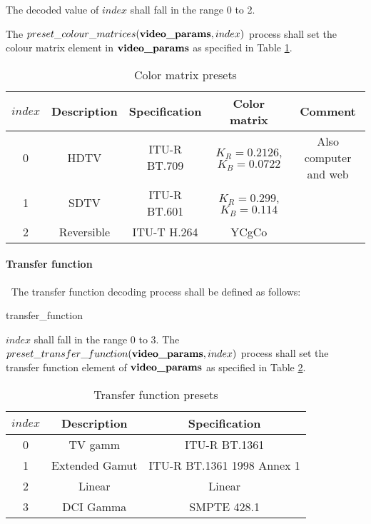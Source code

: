 The decoded value of $index$ shall fall in the range 0 to 2. 

The $preset\_colour\_matrices(\textbf{video\_params},index)$ process shall set the colour 
matrix element in $\textbf{video\_params}$ as specified
in Table \ref{table:matrixvalues}.

\begin{table}[!ht]
\centering
\begin{tabular}{|c|c|c|c|c|}
\hline
\rowcolor[gray]{0.75}$index$ &  {\bf Description} & {\bf Specification} & {\bf Color matrix} & {\bf Comment}\\
\hline
0 & HDTV & ITU-R BT.709 & $K_R=0.2126$, $K_B=0.0722$ & Also computer and web\\ 
\hline
1 & SDTV & ITU-R BT.601 & $K_R=0.299$, $K_B=0.114$ & \\
\hline
2 & Reversible & ITU-T H.264 & YCgCo & \\
\hline
\end{tabular}
\caption{Color matrix presets}\label{table:matrixvalues}
\end{table}

\paragraph{Transfer function}
\label{transferfunction}
$\ $\newline
The transfer function decoding process shall be defined as follows:

\begin{pseudo}{transfer\_function}{\VideoParams}
\bsEND
\end{pseudo}

$index$ shall fall in the range 0 to 3. The $preset\_transfer\_function(\textbf{video\_params},index)$ process shall set the transfer function
element of $\textbf{video\_params}$ as specified
in Table \ref{table:transfervalues}.

\begin{table}[!ht]
\centering
\begin{tabular}{|c|c|c|}
\hline
\rowcolor[gray]{0.75}$index$ & {\bf Description} & {\bf Specification}\\
\hline
0 & TV gamm & ITU-R BT.1361\\ 
\hline
1 & Extended Gamut & ITU-R BT.1361 1998 Annex 1\\
\hline
2 & Linear & Linear\\
\hline
3 & DCI Gamma & SMPTE 428.1\\
\hline
\end{tabular}
\caption{Transfer function presets}\label{table:transfervalues}
\end{table}

